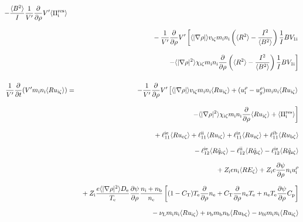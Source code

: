 \documentclass[11pt]{article}
\def\r#1{{\rm#1}}
\def\aves#1{\langle#1\rangle}
\def\dd#1#2{\frac{\partial #1}{\partial #2}}
\def\para{\parallel}
\def\ddrho{\frac{\partial}{\partial\rho}}
\def\ddt{\frac{\partial}{\partial t}}
\def\mi{m_\r{i}}
\def\mb{m_\r{b}}
\def\nee{n_\r{e}}
\def\ni{n_\r{i}}
\def\nb{n_\r{b}}
\def\Te{T_\r{e}}
\def\Zi{Z_\r{i}}
\def\uzt#1{u_{\r{#1}\zeta}}
\def\qzt#1{\hat{q}_{\r{#1}\zeta}}
\def\upara#1{u_{\r{#1}\para}}
\def\urho#1{u_\r{#1}^\rho}
\def\ugrho{u_{g}^\rho}
\def\chis#1{\chi_\r{#1}}
\def\De{D_\r{e}}
\def\nun#1{\nu_\r{0#1}}
\def\bri{\aves{B^2}\aves{R^2} - I^2}
\def\nuL{\nu_\r{L}}
\def\nub{\nu_\r{b}}
\begin{document}
\begin{eqnarray}
%
  - \frac{\aves{B^2}}{I} \frac{1}{V'} \ddrho V' \aves{\Pi_\r{i}^\r{res}}
\nonumber\\[3mm]&&{}
%
  - \frac{1}{V'} \ddrho V' 
    \left[  \aves{|\nabla\rho|} v_{\r{i}\zeta} \mi \ni
          \left(\aves{R^2} - \frac{I^2}{\aves{B^2}}\right) \frac{1}{I}BV_{1\r{i}} \right.
\nonumber\\[3mm]&&{}
    \left.- \aves{|\nabla\rho|^2} \chis{i\zeta} \mi \ni
          \ddrho \left(\aves{R^2} - \frac{I^2}{\aves{B^2}}\right) \frac{1}{I}BV_{1\r{i}}\right]
\\[5mm]
 \frac{1}{V'} \ddt (V' \mi \ni \aves{R \uzt{i}}) &=&
%
  - \frac{1}{V'} \ddrho V' \left[  \aves{|\nabla\rho|} v_{\r{i}\zeta} \mi \ni \aves{R \uzt{i}}
			       +   (\urho{i} - \ugrho) \mi \ni \aves{R \uzt{i}} \right.
\nonumber\\[3mm]&&{}
                        \left. - \aves{|\nabla\rho|^2} \chis{i\zeta} \mi \ni
			         \ddrho \aves{R \uzt{i}}
                               + \aves{\Pi_\r{i}^\r{res}} \right]
\nonumber\\[3mm]&&{}
%
  + \ell_{11}^\r{ie} \aves{R \uzt{e}}
  + \ell_{11}^\r{ii} \aves{R \uzt{i}}
  + \ell_{11}^\r{iz} \aves{R \uzt{z}}
  + \ell_{11}^\r{ib} \aves{R \uzt{b}}
\nonumber\\[2.5mm]&&{}
%
  - \ell_{12}^\r{ie} \aves{R \qzt{e}}
  - \ell_{12}^\r{ii} \aves{R \qzt{i}}
  - \ell_{12}^\r{iz} \aves{R \qzt{z}}
\nonumber\\[2.5mm]&&{}
%
  + \Zi e                 \ni \aves{R E_\zeta}
%
  + \Zi e \dd{\psi}{\rho} \ni \urho{i}
%
\nonumber\\[2.5mm]&&{}
%
%
%
  + \Zi \frac{e \aves{|\nabla\rho|^2} \De}{\Te} \dd{\psi}{\rho} \frac{\ni+\nb}{\nee}
  \left[  (1-C_\r{T})\Te \ddrho \nee
        + C_\r{T} \ddrho \nee \Te
	+ \nee \Te \dd{\psi}{\rho} C_\r{p}\right]
\nonumber\\[2.5mm]&&{}
%
  - \nuL  \mi \ni \aves{R \uzt{i}}
%
  + \nub  \mb \nb \aves{R \uzt{b}}
%
  - \nun{i} \mi \ni \aves{R \uzt{i}}

\end{eqnarray}
\end{document}
